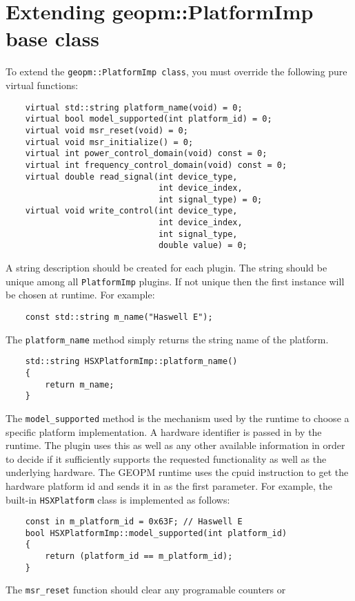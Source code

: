 \documentclass[11pt]{article}
\begin{document}
\section{Extending geopm::PlatformImp base class}
To extend the \verb#geopm::PlatformImp class#, you must override the
following pure virtual functions:
\begin{verbatim}
    virtual std::string platform_name(void) = 0;
    virtual bool model_supported(int platform_id) = 0;
    virtual void msr_reset(void) = 0;
    virtual void msr_initialize() = 0;
    virtual int power_control_domain(void) const = 0;
    virtual int frequency_control_domain(void) const = 0;
    virtual double read_signal(int device_type,
                               int device_index,
                               int signal_type) = 0;
    virtual void write_control(int device_type,
                               int device_index,
                               int signal_type,
                               double value) = 0;
\end{verbatim}
A string description should be created for each plugin. The string
should be unique among all \verb#PlatformImp# plugins. If not unique
then the first instance will be chosen at runtime. For example:
\begin{verbatim}
    const std::string m_name("Haswell E");
\end{verbatim}
The \verb#platform_name# method simply returns the string name of the
platform.
\begin{verbatim}
    std::string HSXPlatformImp::platform_name()
    {
        return m_name;
    }
\end{verbatim}
The \verb#model_supported# method is the mechanism used by the runtime
to choose a specific platform implementation. A hardware identifier is
passed in by the runtime. The plugin uses this as well as any other
available information in order to decide if it sufficiently supports
the requested functionality as well as the underlying hardware. The
GEOPM runtime uses the cpuid instruction to get the hardware platform
id and sends it in as the first parameter. For example, the built-in
\verb#HSXPlatform# class is implemented as follows:
\begin{verbatim}
    const in m_platform_id = 0x63F; // Haswell E
    bool HSXPlatformImp::model_supported(int platform_id)
    {
        return (platform_id == m_platform_id);
    }
\end{verbatim}
The \verb#msr_reset# function should clear any programable counters or
\end{document}
